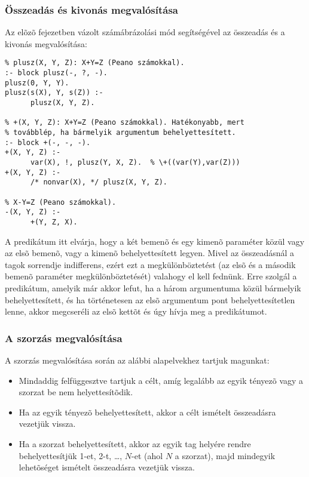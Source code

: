 \subsubsection{Összeadás és kivonás megvalósítása}

Az elõzõ fejezetben vázolt számábrázolási mód segítségével az összeadás
és a kivonás megvalósítása:

\begin{verbatim}
% plusz(X, Y, Z): X+Y=Z (Peano számokkal).
:- block plusz(-, ?, -).
plusz(0, Y, Y).
plusz(s(X), Y, s(Z)) :-
      plusz(X, Y, Z).

% +(X, Y, Z): X+Y=Z (Peano számokkal). Hatékonyabb, mert
% továbblép, ha bármelyik argumentum behelyettesített.
:- block +(-, -, -).
+(X, Y, Z) :- 
      var(X), !, plusz(Y, X, Z).  % \+((var(Y),var(Z)))
+(X, Y, Z) :-
      /* nonvar(X), */ plusz(X, Y, Z).

% X-Y=Z (Peano számokkal).
-(X, Y, Z) :-
      +(Y, Z, X).
\end{verbatim}

A  predikátum itt elvárja, hogy a két bemenõ és egy kimenõ
paraméter közül vagy az elsõ bemenõ, vagy a kimenõ behelyettesített legyen.
Mivel az összeadásnál a tagok sorrendje indifferens, ezért ezt a
megkülönböztetést (az elsõ és a második bemenõ paraméter megkülönböztetését)
valahogy el kell fednünk. Erre szolgál a  predikátum, amelyik
már akkor lefut, ha a három argumentuma közül bármelyik behelyettesített,
és ha történetesen az elsõ argumentum pont behelyettesítetlen lenne, akkor
megcseréli az elsõ kettõt és úgy hívja meg a  predikátumot.

\subsubsection{A szorzás megvalósítása}

A szorzás megvalósítása során az alábbi alapelvekhez tartjuk magunkat:

\begin{itemize}
\item Mindaddig felfüggesztve tartjuk a célt, amíg legalább az egyik tényezõ
vagy a szorzat be nem helyettesítõdik.
\item Ha az egyik tényezõ behelyettesített, akkor a célt ismételt összeadásra
vezetjük vissza.
\item Ha a szorzat behelyettesített, akkor az egyik tag helyére rendre
behelyettesítjük 1-et, 2-t, \ldots, $N$-et (ahol $N$ a szorzat), majd mindegyik
lehetõséget ismételt összeadásra vezetjük vissza.
\end{itemize}

